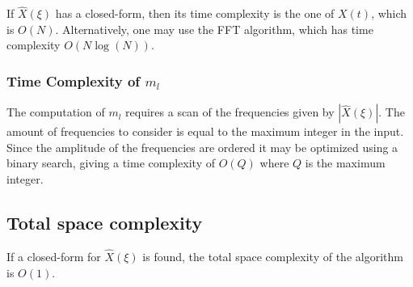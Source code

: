\documentclass{article}
\begin{document}
If \(\hat{X}(\xi)\) has a closed-form,
then its time complexity is the one of \(X(t)\),
which is \(O(N)\).
Alternatively, one may use the FFT algorithm,
which has time complexity \(O(N \log(N))\).

\subsubsection{Time Complexity of \(m_l\)}

The computation of \(m_l\) requires a scan
of the frequencies given by \(|\hat{X}(\xi)|\).
The amount of frequencies to consider is equal to the maximum
integer in the input.
Since the amplitude of the frequencies are ordered it may be optimized
using a binary search, giving a time complexity of \(O(Q)\)
where \(Q\) is the maximum integer.

\subsection{Total space complexity}

If a closed-form for \(\hat{X}(\xi)\) is found,
the total space complexity of the algorithm is \(O(1)\).

\nocite{*} %
\end{document}
